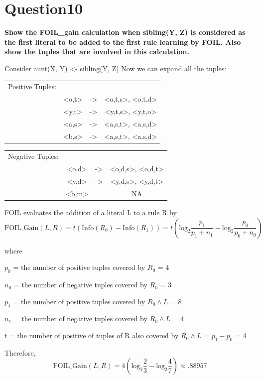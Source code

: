 \documentclass[paper=a4, fontsize=11pt]{scrartcl} %
\numberwithin{equation}{section} %
\numberwithin{figure}{section} %
\numberwithin{table}{section} %
\begin{document}
\newpage
\section*{Question10}
\textbf{Show the FOIL\_gain calculation when sibling(Y, Z) is considered as the first literal to be added to the first rule learning by FOIL. Also show the tuples that are involved in this calculation.}

Consider aunt(X, Y) <- sibling(Y, Z)
Now we can expand all the tuples: 

\begin{tabular}{ c c c c }
Positive Tuples: & & & \\ 
 & <o,t> & -> & <o,t,s>, <o,t,d> \\  
 & <y,t> & -> & <y,t,s>, <y,t,o> \\   
 & <a,s> & -> & <a,s,t>, <a,s,d> \\
 & <b,s> & -> & <a,s,t>, <a,s,d> 
\end{tabular}

\begin{tabular}{ c c c c }
Negative Tuples: & & & \\ 
 & <o,d> & -> & <o,d,s>, <o,d,t> \\
 & <y,d> & -> & <y,d,s>, <y,d,t>\\
 & <b,m> &  & NA
\end{tabular}

\bigbreak 
FOIL evaluates the addition of a literal L to a rule R by 
$$
\text{FOIL\_Gain}(L,R) 
= t(\text{Info}(R_0) - \text{Info}(R_1)) 
= t(\text{log}_2 \frac{p_1}{p_1 + n_1} - \text{log}_2 \frac{p_0}{p_0 + n_0})
$$

where

$p_0$ = the number of positive tuples covered by $R_0$ = 4

$n_0$ = the number of negative tuples covered by $R_0$ = 3

$p_1$ = the number of positive tuples covered by $R_0 \land L$ = 8

$n_1$ = the number of negative tuples covered by $R_0 \land L$ = 4

$t$ = the number of positive of tuples of R also covered by $R_0 \land L$ = $p_1 - p_0$  = 4

\bigbreak 
Therefore, 
$$
\text{FOIL\_Gain}(L,R) 
= 4(\text{log}_2 \frac{2}{3} - \text{log}_2 \frac{4}{7}) \approx .88957
$$
\end{document}
